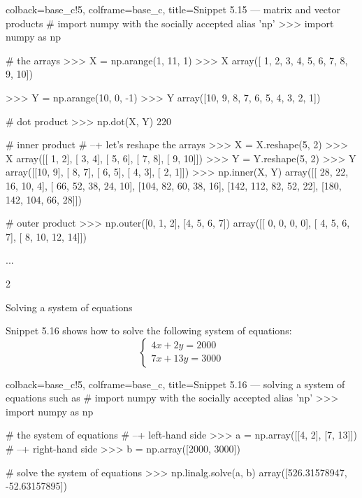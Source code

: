 \documentclass[a4paper,11pt]{book}
\newcommand{\question}[1]{%
    \begin{tcolorbox}[colback=comp_c!10,colframe=comp_c,sidebyside align=top,width=\linewidth,before skip=1ex]
        #1
    \end{tcolorbox}
    \switchcolumn%
}
\newcommand{\note}[1]{%
    \begin{tcolorbox}[colback=white!0,colframe=white!10,width=\linewidth,before skip=1ex]
        #1
    \end{tcolorbox}
}
\begin{document}
\begin{pythoncode}[linenos=true,]{colback=base_c!5, colframe=base_c, title=\sffamily Snippet 5.15 --- matrix and vector products}
# import numpy with the socially accepted alias 'np'
>>> import numpy as np

# the arrays
>>> X = np.arange(1, 11, 1)
>>> X
array([ 1,  2,  3,  4,  5,  6,  7,  8,  9, 10])

>>> Y = np.arange(10, 0, -1)
>>> Y
array([10,  9,  8,  7,  6,  5,  4,  3,  2,  1])

# dot product 
>>> np.dot(X, Y)
220

# inner product
# --+ let's reshape the arrays
>>> X = X.reshape(5, 2)
>>> X
array([[ 1,  2],
       [ 3,  4],
       [ 5,  6],
       [ 7,  8],
       [ 9, 10]])
>>> Y = Y.reshape(5, 2)
>>> Y
array([[10,  9],
       [ 8,  7],
       [ 6,  5],
       [ 4,  3],
       [ 2,  1]])
>>> np.inner(X, Y)
array([[ 28,  22,  16,  10,   4],
       [ 66,  52,  38,  24,  10],
       [104,  82,  60,  38,  16],
       [142, 112,  82,  52,  22],
       [180, 142, 104,  66,  28]])

# outer product
>>> np.outer([0, 1, 2], [4, 5, 6, 7])
array([[ 0,  0,  0,  0],
       [ 4,  5,  6,  7],
       [ 8, 10, 12, 14]])
\end{pythoncode}
...

\begin{paracol}{2}
\question{Solving a system of equations}
\note{Snippet 5.16 shows how to solve the following system of equations:
$$ \left\{
\begin{array}{lr}
4x + 2y = 2000\\
7x + 13y = 3000
\end{array}
\right. $$ 
}
\end{paracol}

\begin{pythoncode}[linenos=true,]{colback=base_c!5, colframe=base_c, title=\sffamily Snippet 5.16 --- solving a system of equations such as}
# import numpy with the socially accepted alias 'np'
>>> import numpy as np

# the system of equations
# --+ left-hand side
>>> a = np.array([[4, 2], [7, 13]])
# --+ right-hand side
>>> b = np.array([2000, 3000])

# solve the system of equations
>>> np.linalg.solve(a, b)
array([526.31578947, -52.63157895])

\end{pythoncode}
\clearpage
\end{document}
